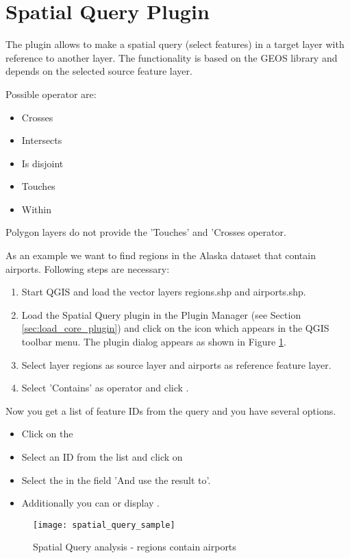 
\section{Spatial Query Plugin}\label{sec:spatial_query}


The  plugin allows to make a spatial 
query (select features) in a target layer with reference to another layer. The 
functionality is based on the GEOS library and depends on the selected source 
feature layer. 

Possible operator are:

\begin{itemize}[label=--]
\item Crosses
\item Intersects
\item Is disjoint
\item Touches
\item Within
\end{itemize}

Polygon layers do not provide the 'Touches' and 'Crosses operator.


As an example we want to find regions in the Alaska dataset that contain 
airports. Following steps are necessary:

\begin{enumerate}
  \item Start QGIS and load the vector layers regions.shp and airports.shp. 
  \item Load the Spatial Query plugin in the Plugin Manager (see Section 
  \ref{sec:load_core_plugin}) and click on the     
  icon which appears in the QGIS toolbar menu. The plugin dialog appears as shown 
  in Figure \ref{fig:spatialquerysample}.
  \item Select layer regions as source layer and airports as reference feature layer.
  \item Select 'Contains' as operator and click .
\end{enumerate}

Now you get a list of feature IDs from the query and you have several options.

\begin{itemize}[label=--]
\item Click on the 
\item Select an ID from the list and click on 
\item Select the  in the field 'And use the 
result to'.
\item Additionally you can  or display .
\end{itemize}

\begin{figure}[ht]
   \centering
   \texttt{[image: spatial\_query\_sample]}
   \caption{Spatial Query analysis - regions contain airports \nixcaption}
   \label{fig:spatialquerysample}
\end{figure}

\FloatBarrier

